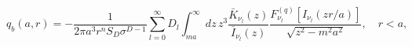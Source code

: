 \begin{equation}
q_b(a,r)=-\frac{1}{2\pi a^{3}r^{n}S_{D}\sigma
^{D-1}}\sum_{l=0}^{\infty
}D_{l}\int_{ma}^{\infty }dz\,z^{3}\frac{\bar{K}_{\nu _{l} }(z)}{\bar{I}_{\nu _{l} }(z)}%
\frac{F_{\nu _{l} }^{(q)}\left[ I_{\nu _{l} }(zr/a)\right] }{\sqrt{z^{2}-m^{2}a^{2}}}%
,\quad r<a,  \label{q1in}
\end{equation}

